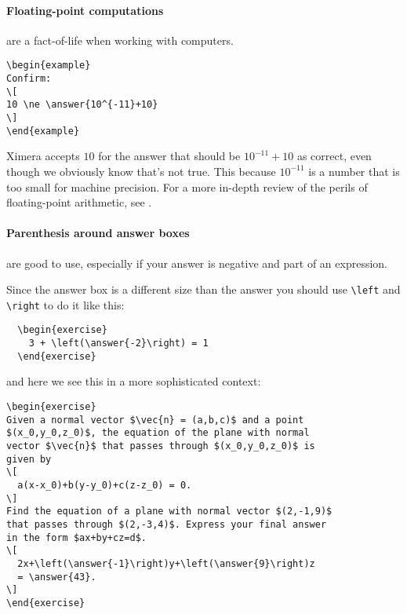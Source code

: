 \documentclass{ximera}
\begin{document}
\paragraph{Floating-point computations} are a fact-of-life when working with
computers.

\begin{verbatim}
\begin{example}
Confirm:
\[
10 \ne \answer{10^{-11}+10}
\]
\end{example}
\end{verbatim}

Ximera accepts $10$ for the answer that should be $10^{-11}+10$  as correct,
even though we obviously know that's not
true.  This because $10^{-11}$ is a number that is too small for machine
precision. For a more in-depth review of the perils of floating-point
arithmetic, see .

\paragraph{Parenthesis around answer boxes} are good to use, especially if your
answer is negative and part of an expression.

Since the answer box is a different size than the answer you should use
\verb!\left! and \verb!\right! to do it like
this:
\begin{verbatim}
  \begin{exercise}
    3 + \left(\answer{-2}\right) = 1
  \end{exercise}
\end{verbatim}
and here we see this in a more sophisticated context:
\begin{verbatim}
\begin{exercise}
Given a normal vector $\vec{n} = (a,b,c)$ and a point
$(x_0,y_0,z_0)$, the equation of the plane with normal
vector $\vec{n}$ that passes through $(x_0,y_0,z_0)$ is
given by
\[
  a(x-x_0)+b(y-y_0)+c(z-z_0) = 0.
\]
Find the equation of a plane with normal vector $(2,-1,9)$
that passes through $(2,-3,4)$. Express your final answer
in the form $ax+by+cz=d$.
\[
  2x+\left(\answer{-1}\right)y+\left(\answer{9}\right)z
  = \answer{43}.
\]
\end{exercise}
\end{verbatim}
\end{document}
